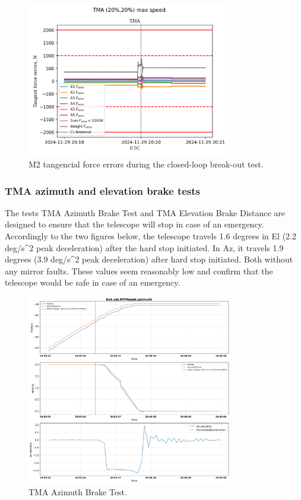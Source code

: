 \begin{figure}
    \centering
    \includegraphics[width=0.8\textwidth]{spa/20_vel_acc_jerk/BLOCK-T241_m2_tangent_force_errors.png}
    \caption{M2 tangencial force errors during the closed-loop break-out test.}
    \label{fig:block241_m2_tangent_force_errors}
    \end{figure}


\subsubsection{TMA azimuth and elevation brake tests}
\label{subsubsec:tma_azimuth_and_elevation_brake_tests}

The tests  TMA Azimuth Brake Test and
 TMA Elevation Brake Distance are designed to ensure that the
telescope will stop in case of an emergency. Accordingly to the two figures below,
the telescope travels 1.6 degrees in El (2.2 deg/s^2 peak deceleration) after the hard stop initiated.
In Az, it travels 1.9 degrees (3.9 deg/s^2 peak deceleration) after hard stop initiated.
Both without any mirror faults. These values seem reasonably low and confirm that the telescope
would be safe in case of an emergency.

\begin{figure}
    \centering
    \includegraphics[width=0.8\textwidth]{spa/20_vel_acc_jerk/BLOCK-T231_az_brake_tests.png}
    \caption{TMA Azimuth Brake Test.}
    \label{fig:block231_azimuth_brake_test}
    \end{figure}

